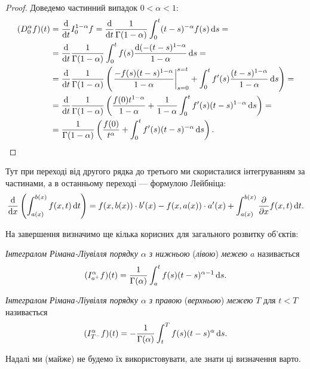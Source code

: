 \begin{proof}
    Доведемо частинний випадок $0 < \alpha < 1$:
    \begin{equation}
        \begin{aligned}
        (\RiemannLiouvilleFractionalDerivative{\alpha} f)(t) &= \frac{\diff}{\diff t} \FractionalIntegral{1 - \alpha} f = \frac{\diff}{\diff t} \frac{1}{\Gamma(1 - \alpha)} \int_0^t (t - s)^{-\alpha} f(s) \diff s = \\
        &= \frac{\diff}{\diff t} \frac{1}{\Gamma(1 - \alpha)} \int_0^t f(s) \frac{\diff (-(t-s)^{1-\alpha}}{1 - \alpha} \diff s = \\
        &= \frac{\diff}{\diff t} \frac{1}{\Gamma(1 - \alpha)} \left( \left. \frac{-f(s)(t-s)^{1-\alpha}}{1 - \alpha} \right|_{s = 0}^{s = t} + \int_0^t f'(s) \frac{(t - s)^{1- \alpha}}{1 - \alpha} \diff s \right) = \\
        &= \frac{\diff}{\diff t} \frac{1}{\Gamma(1 - \alpha)} \left( \frac{f(0) t^{1-\alpha}}{1 - \alpha} + \frac{1}{1 - \alpha} \int_0^t f'(s) (t - s)^{1 - \alpha} \diff s \right) = \\
        &= \frac{1}{\Gamma(1 - \alpha)} \left( \frac{f(0)}{t^\alpha} + \int_0^t f'(s) (t - s)^{- \alpha} \diff s \right).
        \end{aligned}
    \end{equation}
\end{proof}

\begin{remark}
    Тут при переході від другого рядка до третього ми скористалися інтегруванням за частинами, а в останньому переході --- формулою Лейбніца:
    \begin{equation}
        \frac{\mathop{}\!\mathrm{d}}{\mathop{}\!\mathrm{d} x} \left(\int_{a(x)}^{b(x)} f(x, t) \mathop{}\!\mathrm{d} t \right) = f(x, b(x)) \cdot b'(x) - f(x, a(x)) \cdot a'(x) + \int_{a(x)}^{b(x)} \frac{\partial}{\partial x} f(x, t) \mathop{}\!\mathrm{d} t.
    \end{equation}
\end{remark}

На завершення визначимо ще кілька корисних для загального розвитку об'єктів:
\begin{definition}
    \textit{Інтегралом Рімана-Ліувілля порядку $\alpha$ з нижньою }(\textit{лівою})\textit{ межею} $a$ називається
    \begin{equation}
        (I_{{a}^+}^{\alpha} f)(t) = \frac{1}{\Gamma(\alpha)} \int_a^t f(s) (t - s)^{\alpha - 1} \mathop{}\!\mathrm{d} s.
    \end{equation}
\end{definition}

\begin{definition}
    \textit{Інтегралом Рімана-Ліувілля порядку $\alpha$ з правою }(\textit{верхньою})\textit{ межею} $T$ для $t < T$ називається
    \begin{equation}
        (I_{{T}^-}^{\alpha} f)(t) = -\frac{1}{\Gamma(\alpha)} \int_t^T f(s) (t - s)^\alpha \mathop{}\!\mathrm{d} s.
    \end{equation}
\end{definition}

Надалі ми (майже) не будемо їх використовувати, але знати ці визначення варто.